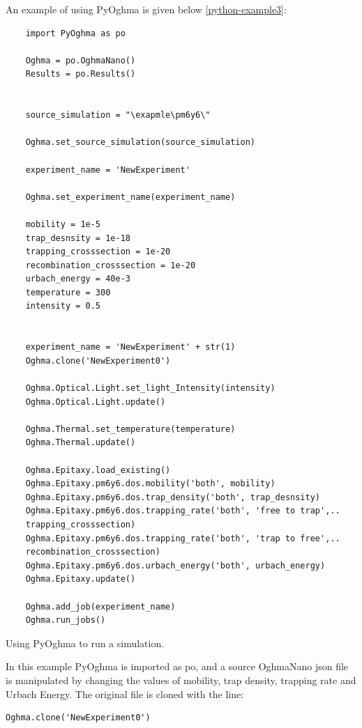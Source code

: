 An example of using PyOghma is given below \ref{python-example3}:

\begin{listing}[H]
\begin{verbatim}
	import PyOghma as po

	Oghma = po.OghmaNano()
	Results = po.Results()


	source_simulation = "\exapmle\pm6y6\"

	Oghma.set_source_simulation(source_simulation)

	experiment_name = 'NewExperiment'

	Oghma.set_experiment_name(experiment_name)

	mobility = 1e-5
	trap_desnsity = 1e-18
	trapping_crosssection = 1e-20
	recombination_crosssection = 1e-20
	urbach_energy = 40e-3
	temperature = 300
	intensity = 0.5


	experiment_name = 'NewExperiment' + str(1)
	Oghma.clone('NewExperiment0')

	Oghma.Optical.Light.set_light_Intensity(intensity)
	Oghma.Optical.Light.update()

	Oghma.Thermal.set_temperature(temperature)
	Oghma.Thermal.update()

	Oghma.Epitaxy.load_existing()
	Oghma.Epitaxy.pm6y6.dos.mobility('both', mobility)
	Oghma.Epitaxy.pm6y6.dos.trap_density('both', trap_desnsity)
	Oghma.Epitaxy.pm6y6.dos.trapping_rate('both', 'free to trap',..
	trapping_crosssection)
	Oghma.Epitaxy.pm6y6.dos.trapping_rate('both', 'trap to free',..
	recombination_crosssection)
	Oghma.Epitaxy.pm6y6.dos.urbach_energy('both', urbach_energy)
	Oghma.Epitaxy.update()

	Oghma.add_job(experiment_name)
	Oghma.run_jobs()
\end{verbatim}
\caption{Using PyOghma to run a simulation.} 
\label{python-example3}
\end{listing}

In this example PyOghma is imported as po, and a source OghmaNano json file is manipulated by changing the values of mobility, trap density, trapping rate and Urbach Energy. The original file is cloned with the line:

\begin{listing}[H]
\begin{verbatim}
Oghma.clone('NewExperiment0')
\end{verbatim}
\end{listing}

